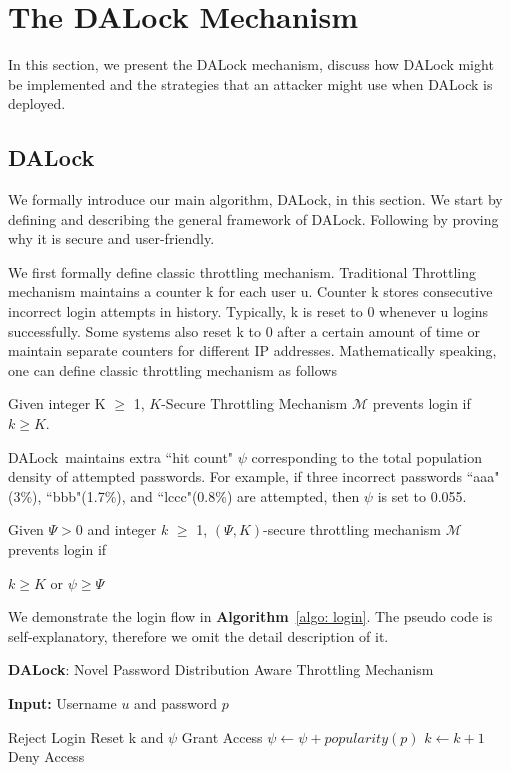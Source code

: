 \section{The DALock Mechanism}
In this section, we present the DALock mechanism, discuss how DALock might be implemented and the strategies that an attacker might use when DALock is deployed.

\subsection{DALock}
We formally introduce our main algorithm, DALock, in this section. We start by defining and describing the general framework of DALock. Following by proving why it is secure and user-friendly.

We first formally define classic throttling mechanism. Traditional Throttling mechanism maintains a counter k for each user u. Counter k stores consecutive incorrect login attempts in history. Typically, k is reset to 0 whenever u logins successfully. Some systems also reset k to 0 after a certain amount of time or maintain separate counters for different IP addresses. Mathematically speaking, one can define classic throttling mechanism as follows

\begin{definition}
Given integer K $\ge $ 1, $K$-Secure Throttling Mechanism $\mathcal{M}$ prevents login if $k \ge K$.
\end{definition}

DALock\ maintains extra ``hit count" $\psi$ corresponding to the total population density of attempted passwords. For example, if three incorrect passwords ``aaa"(3\%), ``bbb"(1.7\%), and ``lccc"(0.8\%) are attempted, then $\psi$ is set to 0.055.

\begin{definition}
Given $\Psi > 0$ and  integer $k$ $\ge $ 1, $(\Psi, K)$-secure throttling mechanism $\mathcal{M}$ prevents login if
\begin{center}$k \ge K$ or $\psi \ge \Psi$\end{center} 
\end{definition}

We demonstrate the login flow in \textbf{Algorithm}~\ref{algo: login}. The pseudo code is self-explanatory, therefore we omit the detail description of it.

\begin{algorithm}[!htb]
	\caption{\textbf{DALock}: Novel Password Distribution Aware Throttling Mechanism }\label{algo: login}
	\textbf{Input: } Username $u$ and password $p$
	\begin{algorithmic}[1]
			\State Reject Login
		\EndIf
			\State Reset k and $\psi$
			\State Grant Access
		\Else
			\State $\psi \leftarrow \psi + popularity(p)$
			\State $k \leftarrow k + 1$
			\State Deny Access
		\EndIf
		
	    \EndFunction
	\end{algorithmic}
\end{algorithm} 

